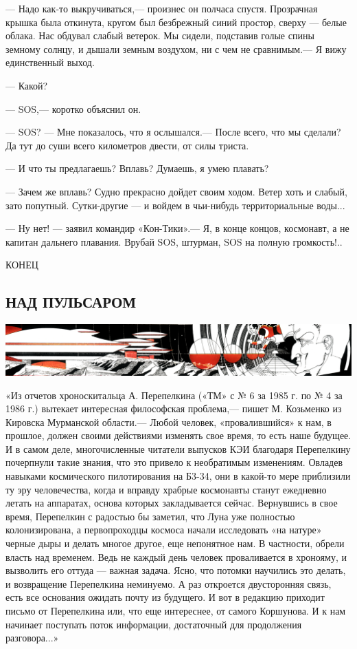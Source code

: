 \documentclass[11pt,a4paper,oneside]{article}
\begin{document}
— Надо как-то выкручиваться,— произнес он полчаса спустя. Прозрачная крышка была откинута, кругом был безбрежный синий простор, сверху — белые облака. Нас обдувал слабый ветерок. Мы сидели, подставив голые спины земному солнцу, и дышали земным воздухом, ни с чем не сравнимым.— Я вижу единственный выход.

— Какой?

— SOS,— коротко объяснил он.

— SOS? — Мне показалось, что я ослышался.— После всего, что мы сделали? Да тут до суши всего километров двести, от силы триста.

— И что ты предлагаешь? Вплавь? Думаешь, я умею плавать?

— Зачем же вплавь? Судно прекрасно дойдет своим ходом. Ветер хоть и слабый, зато попутный. Сутки-другие — и войдем в чьи-нибудь территориальные воды...

— Ну нет! — заявил командир «Кон-Тики».— Я, в конце концов, космонавт, а не капитан дальнего плавания. Врубай SOS, штурман, SOS на полную громкость!..

КОНЕЦ

\subsection{НАД ПУЛЬСАРОМ}
\label{gravi}
\includegraphics[width=\textwidth]{pulsar}

«Из отчетов хроноскитальца А. Перепелкина («ТМ» с № 6 за 1985 г. по № 4 за 1986 г.) вытекает интересная философская проблема,— пишет М. Козьменко из Кировска Мурманской области.— Любой человек, «провалившийся» к нам, в прошлое, должен своими действиями изменять свое время, то есть наше будущее. И в самом деле, многочисленные читатели выпусков КЭИ благодаря Перепелкину почерпнули такие знания, что это привело к необратимым изменениям. Овладев навыками космического пилотирования на Б3-34, они в какой-то мере приблизили ту эру человечества, когда и вправду храбрые космонавты станут ежедневно летать на аппаратах, основа которых закладывается сейчас. Вернувшись в свое время, Перепелкин с радостью бы заметил, что Луна уже полностью колонизирована, а первопроходцы космоса начали исследовать «на натуре» черные дыры и делать многое другое, еще непонятное нам. В частности, обрели власть над временем. Ведь не каждый день человек проваливается в хронояму, и вызволить его оттуда — важная задача. Ясно, что потомки научились это делать, и возвращение Перепелкина неминуемо. А раз откроется двусторонняя связь, есть все основания ожидать почту из будущего. И вот в редакцию приходит письмо от Перепелкина или, что еще интереснее, от самого Коршунова. И к нам начинает поступать поток информации, достаточный для продолжения разговора...»
\end{document}
